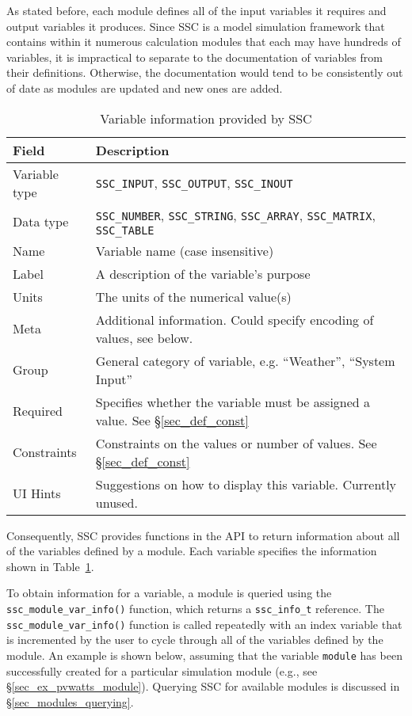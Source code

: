 \documentclass{article}
\begin{document}
As stated before, each module defines all of the input variables it requires and output variables it produces.  Since SSC is a model simulation framework that contains within it numerous calculation modules that each may have hundreds of variables, it is impractical to separate to the documentation of variables from their definitions.  Otherwise, the documentation would tend to be consistently out of date as modules are updated and new ones are added.
\begin{table}[ht]
\begin{center}
\begin{tabular}{ll}
Field & Description\\
\hline
Variable type & \texttt{SSC\_INPUT}, \texttt{SSC\_OUTPUT}, \texttt{SSC\_INOUT} \\
Data type & \texttt{SSC\_NUMBER}, \texttt{SSC\_STRING}, \texttt{SSC\_ARRAY}, \texttt{SSC\_MATRIX}, \texttt{SSC\_TABLE} \\
Name & Variable name (case insensitive) \\
Label & A description of the variable's purpose \\
Units & The units of the numerical value(s) \\
Meta & Additional information. Could specify encoding of values, see below. \\
Group & General category of variable, e.g. ``Weather'', ``System Input'' \\
Required & Specifies whether the variable must be assigned a value. See \S\ref{sec_def_const} \\
Constraints & Constraints on the values or number of values. See \S\ref{sec_def_const} \\
UI Hints & Suggestions on how to display this variable.  Currently unused. \\
\end{tabular}
\caption{Variable information provided by SSC}
\label{tab_varinfo}
\end{center}
\end{table}

Consequently, SSC provides functions in the API to return information about all of the variables defined by a module.  Each variable specifies the information shown in Table~\ref{tab_varinfo}.


To obtain information for a variable, a module is queried using the \texttt{ssc\_module\_var\_info()} function, which returns a \texttt{ssc\_info\_t} reference.  The \texttt{ssc\_module\_var\_info()} function is called repeatedly with an index variable that is incremented by the user to cycle through all of the variables defined by the module.  An example is shown below, assuming that the variable \texttt{module} has been successfully created for a particular simulation module (e.g., see \S\ref{sec_ex_pvwatts_module}).  Querying SSC for available modules is discussed in \S\ref{sec_modules_querying}.
\end{document}
